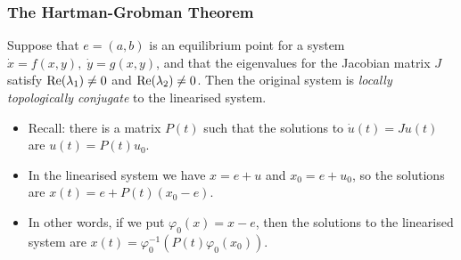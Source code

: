 \documentclass[9pt]{beamer}
\begin{document}
\begin{frame}[t]
 \frametitle{The Hartman-Grobman Theorem}
 \begin{theorem*}{}
  Suppose that $e=(a,b)$ is an equilibrium point for a system
  $\dot{x}=f(x,y),\;\dot{y}=g(x,y)$, and that the eigenvalues for the
  Jacobian matrix $J$ satisfy $\text{Re}(\lambda_1)\neq 0$ and
  $\text{Re}(\lambda_2)\neq 0$.  Then the original system is \emph{locally
   topologically conjugate} to the linearised system.
 \end{theorem*}
 
 \medskip

 \begin{itemize}
  \item<2-> Recall: there is a matrix $P(t)$ such that the solutions to
   $\dot{u}(t)=Ju(t)$ are $u(t)=P(t)u_0$.
  \item<3-> In the linearised system we have $x=e+u$ and $x_0=e+u_0$, so
   the solutions are $x(t)=e+P(t)(x_0-e)$.
  \item<4-> In other words, if we put $\varphi_0(x)=x-e$, then the
   solutions to the linearised system are
   $x(t)=\varphi_0^{-1}(P(t)\varphi_0(x_0))$.
 \end{itemize}

\end{frame}
\end{document}
